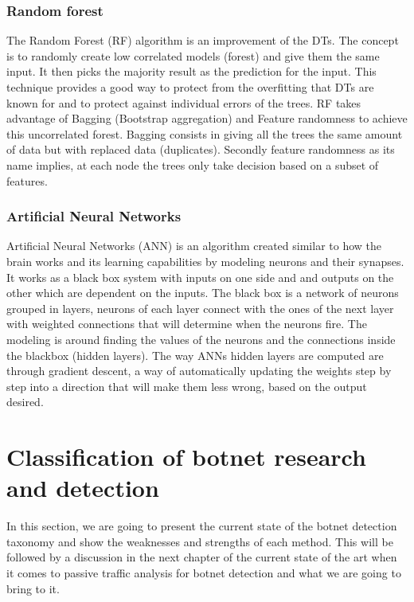 \subsubsection{Random forest}
The Random Forest (RF) algorithm is an improvement of the DTs. The concept is to randomly create low correlated models (forest) and give them the same input. It then picks the majority result as the prediction for the input. This technique provides a good way to protect from the overfitting that DTs are known for and to protect against individual errors of the trees. RF takes advantage of Bagging (Bootstrap aggregation) and Feature randomness to achieve this uncorrelated forest.
Bagging consists in giving all the trees the same amount of data but with replaced data (duplicates). Secondly feature randomness as its name implies, at each node the trees only take decision based on a subset of features.\cite{rf}

\subsubsection{Artificial Neural Networks}
Artificial Neural Networks (ANN) is an algorithm created similar to how the brain works and its learning capabilities by modeling neurons and their synapses. It works as a black box system with inputs on one side and and outputs on the other which are dependent on the inputs. The black box is a network of neurons grouped in layers, neurons of each layer connect with the ones of the next layer with weighted connections that will determine when the neurons fire. The modeling is around finding the values of the neurons and the connections inside the blackbox (hidden layers). The way ANNs hidden layers are computed are through gradient descent, a way of automatically updating the weights step by step into a direction that will make them less wrong, based on the output desired.\cite{ann}

\section{Classification of botnet research and detection}
In this section, we are going to present the current state of the botnet detection taxonomy and show the weaknesses and strengths of each method. This will be followed by a discussion in the next chapter of the current state of the art when it comes to passive traffic analysis for botnet detection and what we are going to bring to it. 

